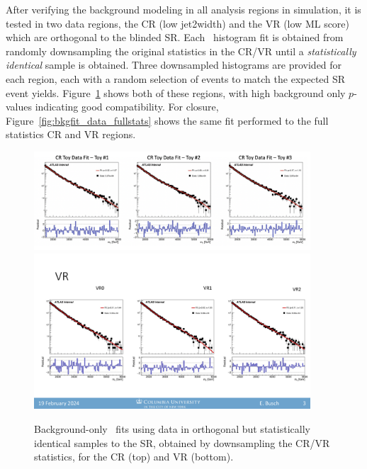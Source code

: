 After verifying the background modeling in all analysis regions in simulation, it is tested in two data regions, the CR (low jet2width) and the VR (low ML score) which are orthogonal to the blinded SR.
Each \mt~histogram fit is obtained from randomly downsampling the original statistics in the CR/VR until a \textit{statistically identical} sample is obtained.
Three downsampled histograms are provided for each region, each with a random selection of events to match the expected SR event yields. 
Figure~\ref{fig:bkgfit_data} shows both of these regions, with high background only $p$-values indicating good compatibility.
For closure, Figure~\ref{fig:bkgfit_data_fullstats} shows the same fit performed to the full statistics CR and VR regions.
\begin{figure}[!htbp]
\centering
   \includegraphics[width=0.92\textwidth]{figures/stats/bkgfit_data_cr}
   \includegraphics[width=0.92\textwidth]{figures/stats/bkgfit_data_vr}
    \caption{Background-only \mt~fits using data in orthogonal but statistically identical samples to the SR, obtained by downsampling the CR/VR statistics, for the CR (top) and VR (bottom).
    \label{fig:bkgfit_data}}
\end{figure}

